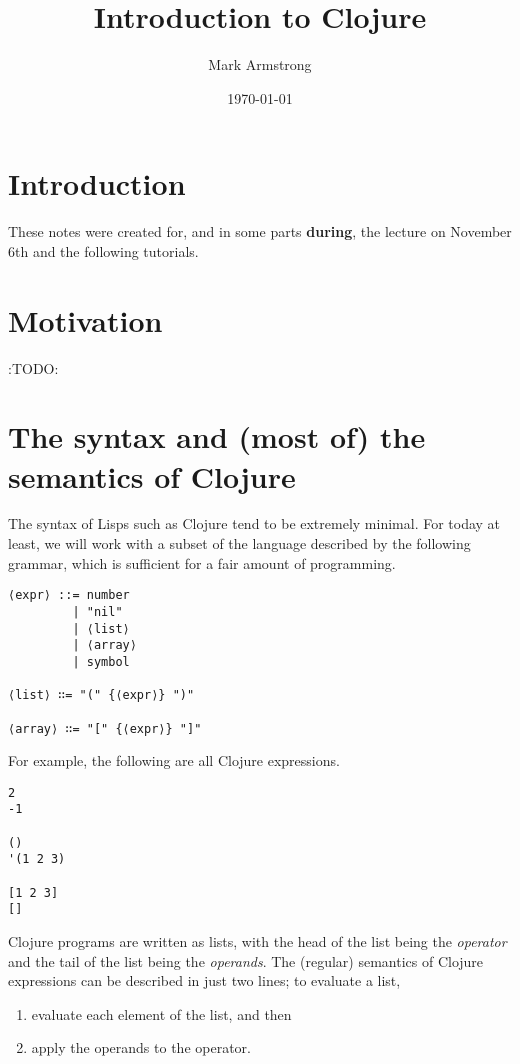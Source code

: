 \documentclass[11pt]{article}
\author{Mark Armstrong}
\date{\today}
\title{Introduction to Clojure}
\begin{document}
\maketitle
\tableofcontents


\section{Introduction}
\label{sec:org0fe2fbc}
These notes were created for, and in some parts \textbf{during},
the lecture on November 6th and the following tutorials.

\section{Motivation}
\label{sec:orgccdfea6}
:TODO:

\section{The syntax and (most of) the semantics of Clojure}
\label{sec:org1f9aa5e}
The syntax of Lisps such as Clojure tend to be extremely minimal.
For today at least, we will work with a subset of the language
described by the following grammar, which is sufficient
for a fair amount of programming.
\begin{verbatim}
⟨expr⟩ ::= number
         | "nil"
         | ⟨list⟩
         | ⟨array⟩
         | symbol

⟨list⟩ ∷= "(" {⟨expr⟩} ")"

⟨array⟩ ∷= "[" {⟨expr⟩} "]"
\end{verbatim}

For example, the following are all Clojure expressions.
\begin{verbatim}
2
-1

()
'(1 2 3)

[1 2 3]
[]

\end{verbatim}

Clojure programs are written as lists,
with the head of the list being the \emph{operator} and
the tail of the list being the \emph{operands}.
The (regular) semantics of Clojure expressions
can be described in just two lines;
to evaluate a list,
\begin{enumerate}
\item evaluate each element of the list, and then
\item apply the operands to the operator.
\end{enumerate}
\end{document}
